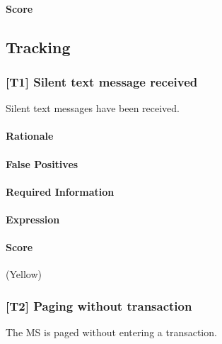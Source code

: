 \documentclass[a4paper,11pt,notitlepage,bigheadings,oneside]{scrartcl}
\begin{document}
\paragraph{Score}

\TBD{}

\subsection{Tracking}

\subsubsection{[T1] Silent text message received}

Silent text messages have been received.

\paragraph{Rationale}

\TBD{}

\paragraph{False Positives}


\paragraph{Required Information}

\TBD{}

\paragraph{Expression}

\TBD{}

\paragraph{Score}

\TBD{} (Yellow)

\subsubsection{[T2] Paging without transaction}

The MS is paged without entering a transaction.
\end{document}
